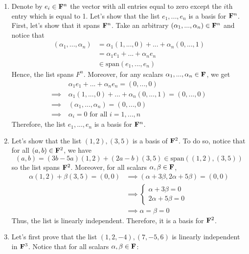 \begin{solution}
    \begin{enumerate}[label=(\alph*)]
        \item Denote by $e_i \in \mathbf{F}^n$ the vector with all entries equal to zero except the $i$th entry which is equal to 1. Let's show that the list $e_1, ..., e_n$ is a basis for $\mathbf{F}^n$. First, let's show that it spans $\mathbf{F}^n$. Take an arbitrary $(\alpha_1, ..., \alpha_n) \in \mathbf{F}^n$ and notice that
        \begin{align*}
            (\alpha_1, ..., \alpha_n) &= \alpha_1(1, ..., 0) + ...  + \alpha_n (0, ..., 1) \\
            &= \alpha_1 e_1  + ... + \alpha_n e_n \\
            & \in \text{span}(e_1, ..., e_n)
        \end{align*}
        Hence, the list spans $F^n$. Moreover, for any scalars $\alpha_1, ..., \alpha_n \in \mathbf{F}$, we get
        \begin{align*}
            & \alpha_1 e_1 + ... + \alpha_n e_n = (0,...,0) \\
            \implies \ & \alpha_1(1, ..., 0) + ...  + \alpha_n (0, ..., 1) = (0,...,0) \\
            \implies \ & (\alpha_1, ..., \alpha_n) = (0,...,0) \\
            \implies \ & \alpha_i = 0 \text{ for all } i= 1,...,n
        \end{align*}
        Therefore, the list $e_1, ..., e_n$ is a basis for $\mathbf{F}^n$.
        \item Let's show that the list $(1,2), (3, 5)$ is a basis of $\mathbf{F}^2$. To do so, notice that for all $(a,b) \in \mathbf{F}^2$, we have
        $$(a,b) = (3b - 5a)(1,2) + (2a - b)(3,5) \in \text{span}((1,2), (3, 5))$$
        so the list spans $\mathbf{F}^2$. Moreover, for all scalars $\alpha, \beta \in \mathbf{F}$,
        \begin{align*}
            \alpha(1,2) + \beta(3,5) = (0,0) &\implies (\alpha + 3\beta, 2\alpha + 5\beta) = (0,0)\\
            &\implies \begin{cases}
                \alpha + 3\beta = 0 \\ 2\alpha + 5\beta = 0
            \end{cases} \\
            &\implies \alpha = \beta = 0
        \end{align*}
        Thus, the list is linearly independent. Therefore, it is a basis for $\mathbf{F}^2$.
        \item Let's first prove that the list $(1,2,-4), (7, -5, 6)$ is linearly independent in $\mathbf{F}^3$. Notice that for all scalars $\alpha, \beta \in \mathbf{F}$:

\end{enumerate}
\end{solution}

